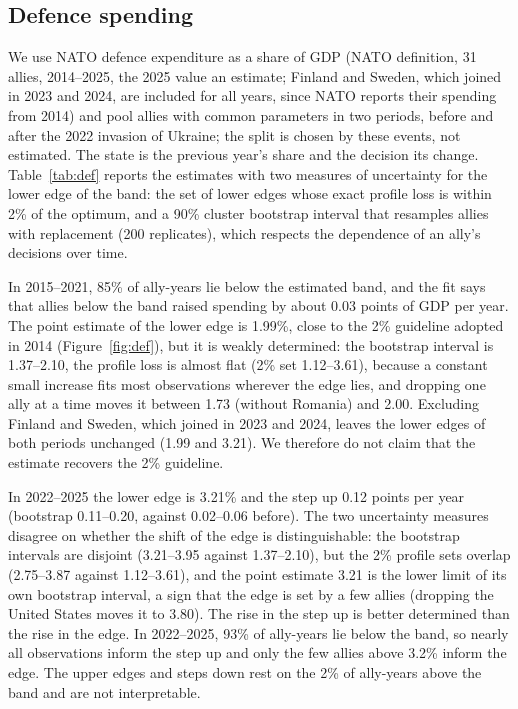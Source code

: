 \documentclass[pdflatex,sn-basic]{sn-jnl}
\theoremstyle{thmstyleone}\newtheorem{proposition}{Proposition}\newtheorem{theorem}{Theorem}
\theoremstyle{thmstylethree}\newtheorem{remark}{Remark}
\begin{document}
\subsection{Defence spending}\label{sec:def}
We use NATO defence expenditure as a share of GDP (NATO definition, 31 allies, 2014--2025, the 2025 value an estimate; Finland and Sweden, which joined in 2023 and 2024, are included for all years, since NATO reports their spending from 2014) and pool allies with common parameters in two periods, before and after the 2022 invasion of Ukraine; the split is chosen by these events, not estimated. The state is the previous year's share and the decision its change. Table~\ref{tab:def} reports the estimates with two measures of uncertainty for the lower edge of the band: the set of lower edges whose exact profile loss is within 2\% of the optimum, and a 90\% cluster bootstrap interval that resamples allies with replacement (200 replicates), which respects the dependence of an ally's decisions over time.

In 2015--2021, 85\% of ally-years lie below the estimated band, and the fit says that allies below the band raised spending by about 0.03 points of GDP per year. The point estimate of the lower edge is 1.99\%, close to the 2\% guideline adopted in 2014 (Figure~\ref{fig:def}), but it is weakly determined: the bootstrap interval is 1.37--2.10, the profile loss is almost flat (2\% set 1.12--3.61), because a constant small increase fits most observations wherever the edge lies, and dropping one ally at a time moves it between 1.73 (without Romania) and 2.00. Excluding Finland and Sweden, which joined in 2023 and 2024, leaves the lower edges of both periods unchanged (1.99 and 3.21). We therefore do not claim that the estimate recovers the 2\% guideline.

In 2022--2025 the lower edge is 3.21\% and the step up 0.12 points per year (bootstrap 0.11--0.20, against 0.02--0.06 before). The two uncertainty measures disagree on whether the shift of the edge is distinguishable: the bootstrap intervals are disjoint (3.21--3.95 against 1.37--2.10), but the 2\% profile sets overlap (2.75--3.87 against 1.12--3.61), and the point estimate 3.21 is the lower limit of its own bootstrap interval, a sign that the edge is set by a few allies (dropping the United States moves it to 3.80). The rise in the step up is better determined than the rise in the edge. In 2022--2025, 93\% of ally-years lie below the band, so nearly all observations inform the step up and only the few allies above 3.2\% inform the edge. The upper edges and steps down rest on the 2\% of ally-years above the band and are not interpretable.
\end{document}
